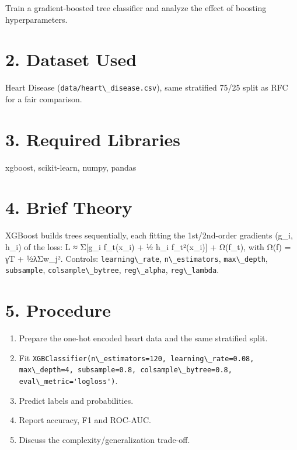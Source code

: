 Train a gradient-boosted tree classifier and analyze the effect of
boosting hyperparameters.

\section{2. Dataset Used}\label{dataset-used-2}

Heart Disease (\passthrough{\lstinline!data/heart\_disease.csv!}), same
stratified 75/25 split as RFC for a fair comparison.

\section{3. Required Libraries}\label{required-libraries-2}

xgboost, scikit-learn, numpy, pandas

\section{4. Brief Theory}\label{brief-theory-2}

XGBoost builds trees sequentially, each fitting the 1st/2nd-order
gradients (g\_i, h\_i) of the loss: L ≈ Σ{[}g\_i f\_t(x\_i) + ½ h\_i
f\_t²(x\_i){]} + Ω(f\_t), with Ω(f) = γT + ½λΣw\_j². Controls:
\passthrough{\lstinline!learning\_rate!},
\passthrough{\lstinline!n\_estimators!},
\passthrough{\lstinline!max\_depth!},
\passthrough{\lstinline!subsample!},
\passthrough{\lstinline!colsample\_bytree!},
\passthrough{\lstinline!reg\_alpha!},
\passthrough{\lstinline!reg\_lambda!}.

\section{5. Procedure}\label{procedure-2}

\begin{enumerate}
\def\labelenumi{\arabic{enumi}.}
\tightlist
\item
  Prepare the one-hot encoded heart data and the same stratified split.
\item
  Fit
  \passthrough{\lstinline!XGBClassifier(n\_estimators=120, learning\_rate=0.08, max\_depth=4, subsample=0.8, colsample\_bytree=0.8, eval\_metric='logloss')!}.
\item
  Predict labels and probabilities.
\item
  Report accuracy, F1 and ROC-AUC.
\item
  Discuss the complexity/generalization trade-off.
\end{enumerate}

